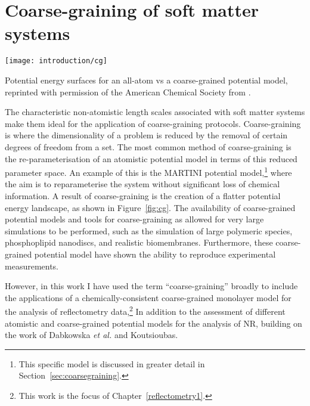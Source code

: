 \section{Coarse-graining of soft matter systems}
%
\begin{marginfigure}
    \texttt{[image: introduction/cg]}
    \caption{Potential energy surfaces for an all-atom vs a coarse-grained potential model, reprinted with permission of the American Chemical Society from \cite{kmiecik_coarse-grained_2016}.}
    \label{fig:cg}
\end{marginfigure}
%
The characteristic non-atomistic length scales associated with soft matter systems make them ideal for the application of coarse-graining protocols.
Coarse-graining is where the dimensionality of a problem is reduced by the removal of certain degrees of freedom from a set.
The most common method of coarse-graining is the re-parameterisation of an atomistic potential model in terms of this reduced parameter space.
An example of this is the MARTINI potential model,\footnote{This specific model is discussed in greater detail in Section~\ref{sec:coarsegraining}.} where the aim is to reparameterise the system without significant loss of chemical information.\autocite{marrink_martini_2007}
A result of coarse-graining is the creation of a flatter potential energy landscape, as shown in Figure~\ref{fig:cg}.
The availability of coarse-grained potential models and tools for coarse-graining as allowed for very large simulations to be performed, such as the simulation of large polymeric species,\autocite{carbone_transferability_2008} phosphoplipid nanodiscs,\autocite{xue_molecular_2018} and realistic biomembranes.\autocite{marrink_computational_2019}
Furthermore, these coarse-grained potential model have shown the ability to reproduce experimental measurements.\autocite{negro_experimental_2014,nawaz_interactions_2012}

However, in this work I have used the term ``coarse-graining'' broadly to include the applications of a chemically-consistent coarse-grained monolayer model for the analysis of reflectometry data,\footnote{This work is the focus of Chapter~\ref{reflectometry1}.}
In addition to the assessment of different atomistic and coarse-grained potential models for the analysis of NR, building on the work of Dabkowska \emph{et al.} and Koutsioubas.\autocite[][see Chapter~\ref{reflectometry2}]{dabkowska_modulation_2014,koutsioubas_combined_2016}
